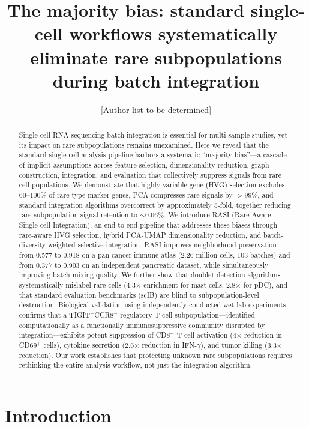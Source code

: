 \documentclass[10pt]{article}
\title{\textbf{The majority bias: standard single-cell workflows systematically eliminate rare subpopulations during batch integration}}
\author{[Author list to be determined]}
\date{}
\begin{document}
\maketitle

\begin{abstract}
Single-cell RNA sequencing batch integration is essential for multi-sample studies, yet its impact on rare subpopulations remains unexamined. Here we reveal that the standard single-cell analysis pipeline harbors a systematic ``majority bias''---a cascade of implicit assumptions across feature selection, dimensionality reduction, graph construction, integration, and evaluation that collectively suppress signals from rare cell populations. We demonstrate that highly variable gene (HVG) selection excludes 60--100\% of rare-type marker genes, PCA compresses rare signals by $>$99\%, and standard integration algorithms overcorrect by approximately 5-fold, together reducing rare subpopulation signal retention to $\sim$0.06\%. We introduce RASI (Rare-Aware Single-cell Integration), an end-to-end pipeline that addresses these biases through rare-aware HVG selection, hybrid PCA-UMAP dimensionality reduction, and batch-diversity-weighted selective integration. RASI improves neighborhood preservation from 0.577 to 0.918 on a pan-cancer immune atlas (2.26 million cells, 103 batches) and from 0.377 to 0.903 on an independent pancreatic dataset, while simultaneously improving batch mixing quality. We further show that doublet detection algorithms systematically mislabel rare cells (4.3$\times$ enrichment for mast cells, 2.8$\times$ for pDC), and that standard evaluation benchmarks (scIB) are blind to subpopulation-level destruction. Biological validation using independently conducted wet-lab experiments confirms that a TIGIT$^+$CCR8$^-$ regulatory T cell subpopulation---identified computationally as a functionally immunosuppressive community disrupted by integration---exhibits potent suppression of CD8$^+$ T cell activation (4$\times$ reduction in CD69$^+$ cells), cytokine secretion (2.6$\times$ reduction in IFN-$\gamma$), and tumor killing (3.3$\times$ reduction). Our work establishes that protecting unknown rare subpopulations requires rethinking the entire analysis workflow, not just the integration algorithm.
\end{abstract}

\section{Introduction}
\end{document}
